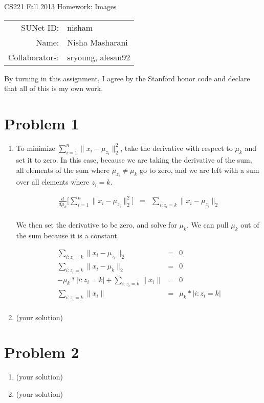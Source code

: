 \documentclass[12pt]{article}
\begin{document}
\begin{center}
{\Large CS221 Fall 2013 Homework: Images}

\begin{tabular}{rl}
SUNet ID: & nisham \\
Name: & Nisha Masharani \\
Collaborators: & sryoung, alesan92
\end{tabular}
\end{center}

By turning in this assignment, I agree by the Stanford honor code and declare
that all of this is my own work.

\section*{Problem 1}

\begin{enumerate}[label=(\alph*)]
  \item To minimize $\sum_{i=1}^{n} \|x_i-\mu_{z_i}\|_2^2$, take the derivative with respect to $\mu_k$ and set it to zero. In this case, because we are taking the derivative of the sum, all elements of the sum where $\mu_{z_i} \ne \mu_k$ go to zero, and we are left with a sum over all elements where $z_i = k$.

  \begin{eqnarray*}
  \frac{d}{d\mu_k}\biggl[\sum_{i=1}^{n} \|x_i-\mu_{z_i}\|_2^2\biggr] &=& \sum_{i:z_i = k} \|x_i-\mu_{z_i}\|_2 \\
  \end{eqnarray*}

  We then set the derivative to be zero, and solve for $\mu_k$. We can pull $\mu_k$ out of the sum because it is a constant.

  \begin{eqnarray*}
  \sum_{i:z_i = k} \|x_i-\mu_{z_i}\|_2 &=& 0\\
  \sum_{i:z_i = k} \|x_i-\mu_k\|_2 &=& 0\\
  -\mu_k * |{i:z_i = k}| + \sum_{i:z_i = k} \|x_i\| &=& 0\\
  \sum_{i:z_i = k} \|x_i\| &=& \mu_k * |{i:z_i = k}|\\

  \end{eqnarray*}

  \item (your solution)
\end{enumerate}

\section*{Problem 2}

\begin{enumerate}[label=(\alph*)]
  \item (your solution)
  \item (your solution)
\end{enumerate}
\end{document}
